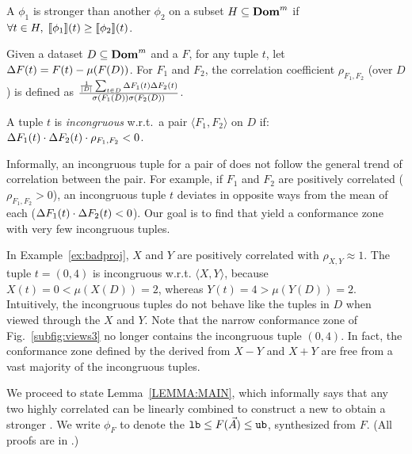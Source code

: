 \begin{definition}\label{def:stronger}
	\begin{sloppypar}
A \di $\phi_1$ is stronger
than another \di $\phi_2$ on a subset $H \subseteq \mathbf{Dom}^m$ if
$\forall t \in H, \; {[\![{\phi_1}]\!]}(t) \geq {[\![{\phi_2}]\!]}(t)$.
	\end{sloppypar}
\end{definition}

%
Given a dataset $D\subseteq \mathbf{Dom}^m$ and a \view $F$, for any tuple $t$, let
${\Delta{F}({t})} = F(t) - {\mathtt{\mu}}(F(D))$. For \views $F_1$ and $F_2$, the correlation
coefficient $\rho_{F_1,F_2}$ (over $D$) is defined as
$\frac{\frac{1}{|D|}\sum_{t\in D}
{\Delta{F_1}({t})}{\Delta{F_2}({t})}}{{\mathtt{\sigma}}(F_1(D)){\mathtt{\sigma}}(F_2(D))}$.
%
\begin{definition}	
A tuple $t$ is {\em{incongruous}} w.r.t.\ a
\view pair $\!\langle F_1, F_2\rangle\!$ on $D$ if: 
${\Delta{F_1}({t})}\cdot{\Delta{F_2}({t})}\cdot\rho_{F_1,F_2}<0$.
%
\end{definition}



Informally, an incongruous tuple for a pair of \views does not follow the
general trend of correlation between the \view pair. For example, if $F_1$ and
$F_2$ are positively correlated ($\rho_{F_1,F_2}>0$), an incongruous tuple $t$
deviates in opposite ways from the mean of each \view
(${\Delta{F_1}({t})}\cdot{\Delta{F_2}({t})}<0$). Our goal is to find \views that yield a
conformance zone with very few incongruous tuples.

\begin{example} 
	In Example~\ref{ex:badproj}, $X$ and $Y$ are positively
correlated with $\rho_{X,Y} \approx 1$. The tuple
$t=(0,4)$ is incongruous w.r.t. $\langle X, Y \rangle$, because $X(t) = 0 <
\mu(X(D)) = 2$, whereas $Y(t) = 4 > \mu(Y(D)) = 2$. Intuitively, the
incongruous tuples do not behave like the tuples in $D$ when viewed through the
\views $X$ and $Y$. Note that the narrow conformance zone of
Fig.~\ref{subfig:views3} no longer contains the incongruous tuple $(0, 4)$.
In fact, the conformance zone defined by the \dis derived from \views $X - Y$
and $X + Y$ are free from a vast majority of the incongruous tuples.
%
\end{example}


We proceed to state Lemma~\ref{LEMMA:MAIN}, which informally says that any two
highly correlated \views can be linearly combined to construct a new \view to
obtain a stronger \invariant. We write $\phi_F$ to denote the \di ${\mathtt{lb}} \le
F(\vec{A}) \le {\mathtt{ub}}$, synthesized from $F$. (All proofs are in \appOrTechRep.)



